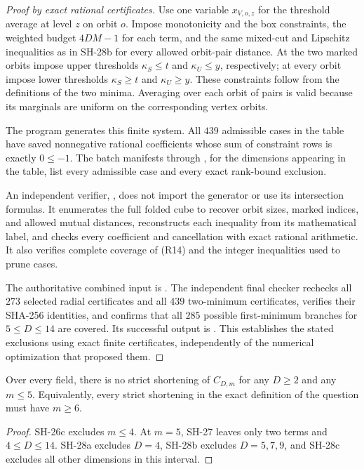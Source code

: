 \begin{proof}[Proof by exact rational certificates]
Use one variable $x_{V,o,z}$ for the threshold average
at level $z$ on orbit $o$.  Impose monotonicity and the
box constraints, the weighted budget $4DM-1$ for each
term, and the same mixed-cut and Lipschitz inequalities
as in SH-28b for every allowed orbit-pair distance.
At the two marked orbits impose upper thresholds
$\kappa_S\le t$ and $\kappa_U\le y$, respectively;
at every orbit impose lower thresholds
$\kappa_S\ge t$ and $\kappa_U\ge y$.
These constraints follow from the definitions of the
two minima.  Averaging over each orbit of pairs is
valid because its marginals are uniform on the
corresponding vertex orbits.

The program
generates this finite system.  All $439$ admissible
cases in the table have saved nonnegative rational
coefficients whose sum of constraint rows is exactly
$0\le-1$.  The batch manifests
 through
, for
the dimensions appearing in the table, list every
admissible case and every exact rank-bound exclusion.

An independent verifier,
,
does not import the generator or use its intersection
formulas.  It enumerates the full folded cube to
recover orbit sizes, marked indices, and allowed
mutual distances, reconstructs each inequality from
its mathematical label, and checks every coefficient
and cancellation with exact rational arithmetic.
It also verifies complete coverage of (R14) and the
integer inequalities used to prune cases.

The authoritative combined input is
.
The independent final checker
rechecks all $273$ selected radial certificates and
all $439$ two-minimum certificates, verifies their
SHA-256 identities, and confirms that all $285$
possible first-minimum branches for $5\le D\le14$
are covered.  Its successful output is
.
This establishes the stated exclusions using exact
finite certificates, independently of the numerical
optimization that proposed them.
\end{proof}

\begin{theorem}
\label{thm:no-shortening-width-five}
Over every field, there is no strict shortening of
$C_{D,m}$ for any $D\ge2$ and any $m\le5$.
Equivalently, every strict shortening in the exact
definition of the question must have $m\ge6$.
\end{theorem}
\begin{proof}
SH-26c excludes $m\le4$.
At $m=5$, SH-27 leaves only two terms and
$4\le D\le14$.  SH-28a excludes $D=4$,
SH-28b excludes $D=5,7,9$, and SH-28c excludes
all other dimensions in this interval.
\end{proof}

